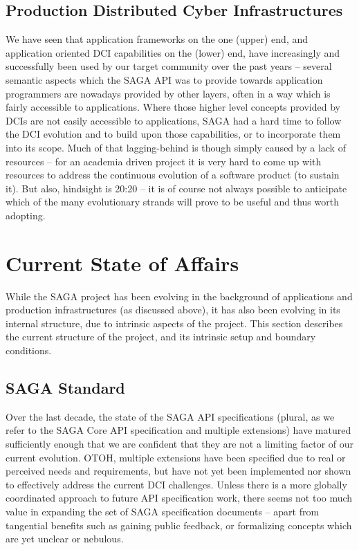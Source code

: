 \documentclass{article}
\newcommand{\B}[1]{\textbf{#1}}
\newcommand{\todo}[1]{{\textcolor{red}{\B{TODO:} #1 }}}
\begin{document}
 \subsection{Production Distributed Cyber Infrastructures}

  We have seen that application frameworks on the one (upper) end, and
  application oriented DCI capabilities on the (lower) end, have
  increasingly and successfully been used by our target community over
  the past years -- several semantic aspects which the SAGA API was to
  provide towards application programmers are nowadays provided by
  other layers, often in a way which is fairly accessible to
  applications.  Where those higher level concepts provided by DCIs
  are not easily accessible to applications, SAGA had a hard time to
  follow the DCI evolution and to build upon those capabilities, or to
  incorporate them into its scope.  Much of that lagging-behind is
  though simply caused by a lack of resources -- for an academia
  driven project it is very hard to come up with resources to address
  the continuous evolution of a software product (to sustain it).  But
  also, hindsight is 20:20 -- it is of course not always possible to
  anticipate which of the many evolutionary strands will prove to be
  useful and thus worth adopting.


%


\section{Current State of Affairs}
\label{sec:state}


 While the SAGA project has been evolving in the background of
 applications and production infrastructures (as discussed above), it
 has also been evolving in its internal structure, due to intrinsic
 aspects of the project.  This section describes the current structure
 of the project, and its intrinsic setup and boundary conditions.



\subsection{SAGA Standard}

  Over the last decade, the state of the SAGA API specifications
  (plural, as we refer to the SAGA Core API specification and multiple
  extensions) have matured sufficiently enough that we are confident
  that they are not a limiting factor of our current evolution.  OTOH,
  multiple extensions have been specified due to real or perceived
  needs and requirements, but have not yet been implemented nor shown
  to effectively address the current DCI challenges.  Unless there is
  a more globally coordinated approach to future API specification
  work, there seems not too much value in expanding the set of SAGA
  specification documents -- apart from tangential benefits such as
  gaining public feedback, or formalizing concepts which are yet
  unclear or nebulous.
\end{document}
